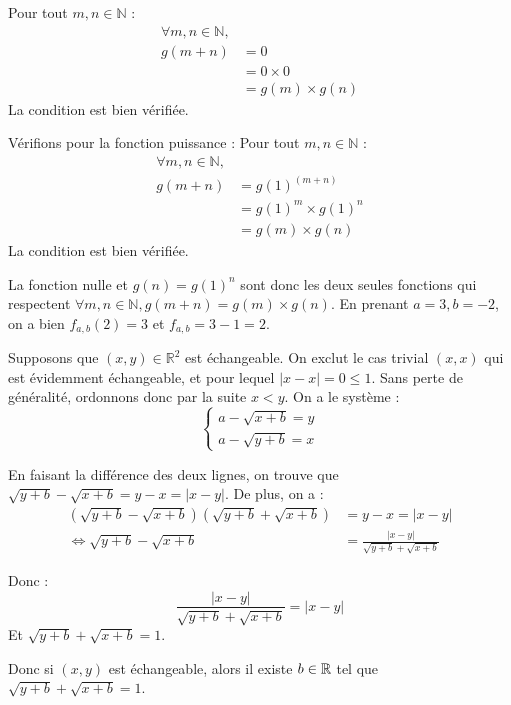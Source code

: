 \documentclass[]{../templates/homework}
\begin{document}
Pour tout $m, n \in \mathbb{N}$ :
\begin{align*}
	\forall m, n \in \mathbb{N}, \\
	g(m + n) &= 0 \\
	&= 0 \times 0 \\
	&= g(m) \times g(n)
\end{align*}
La condition est bien vérifiée.

Vérifions pour la fonction puissance :
Pour tout $m, n \in \mathbb{N}$ :
\begin{align*}
	\forall m, n \in \mathbb{N}, \\
	g(m + n) &= g(1)^{(m + n)} \\
	&= g(1)^m \times g(1)^n \\
	&= g(m) \times g(n)
\end{align*}
La condition est bien vérifiée.

La fonction nulle et $g(n) = g(1)^n$ sont donc les deux seules fonctions qui respectent $\forall m, n \in \mathbb{N}, g(m + n) = g(m) \times g(n)$.
\subproblem
En prenant $a = 3, b=-2$, on a bien $f_{a,b}(2) = 3$ et $f_{a,b} = 3-1 = 2$.
\subproblem

Supposons que $(x,y) \in \mathbb R^2$ est échangeable. On exclut le cas trivial $(x,x)$ qui est évidemment échangeable, et pour lequel $|x-x| = 0 \leq 1$. Sans perte de généralité, ordonnons donc par la suite $x < y$. On a le système :
\begin{equation*}
	\begin{cases}
		a - \sqrt{x+b} = y \\
		a - \sqrt{y+b} = x
	\end{cases}
\end{equation*}

En faisant la différence des deux lignes, on trouve que $\sqrt{y+b} - \sqrt{x+b} = y-x = |x-y|$. De plus, on a :
\begin{equation*}
	\begin{split}
		(\sqrt{y+b} - \sqrt{x+b})(\sqrt{y+b} + \sqrt{x+b}) & =y-x = |x-y|                             \\
		\iff \sqrt{y+b} - \sqrt{x+b}                       & = \frac {|x-y|}{\sqrt{y+b} + \sqrt{x+b}}
	\end{split}
\end{equation*}

Donc : $$\frac {|x-y|}{\sqrt{y+b} + \sqrt{x+b}} = |x-y|$$
Et $\sqrt{y+b} + \sqrt{x+b} = 1$.

Donc si $(x,y)$ est échangeable, alors il existe $b\in\mathbb R$ tel que $\sqrt{y+b} + \sqrt{x+b} = 1$.
\end{document}
